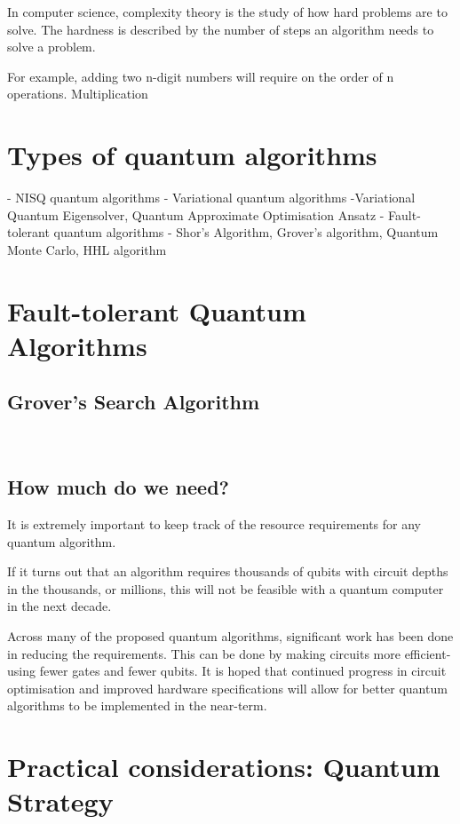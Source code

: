 \documentclass{book}
\begin{document}
In computer science, complexity theory is the study of how hard problems are to solve. The hardness is described by the number of steps an algorithm needs to solve a problem.

For example, adding two n-digit numbers will require on the order of n operations. Multiplication 



\section{ Types of quantum algorithms} 


- NISQ quantum algorithms 
- Variational quantum algorithms 
    -Variational Quantum Eigensolver, Quantum Approximate Optimisation Ansatz
- Fault-tolerant quantum algorithms 
    - Shor's Algorithm, Grover's algorithm, Quantum Monte Carlo,  HHL algorithm 


\section{Fault-tolerant Quantum Algorithms} 

\subsection{ Grover's Search Algorithm}


\



\subsection{How much do we need?}

It is extremely important to keep track of the resource requirements for any quantum algorithm. 

If it turns out that an algorithm requires thousands of qubits with circuit depths in the thousands, or millions, this will not be feasible with a quantum computer in the next decade. 

Across many of the proposed quantum algorithms, significant work has been done in reducing the requirements. This can be done by making circuits more efficient- using fewer gates and fewer qubits.  It is hoped that continued progress in circuit optimisation and improved hardware specifications will allow for better quantum algorithms to be implemented in the near-term. 


\section{Practical considerations: Quantum Strategy}
\end{document}
